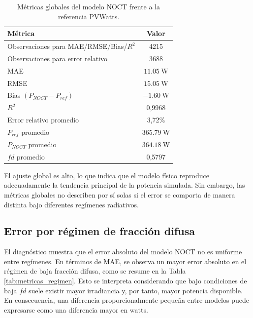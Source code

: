 \documentclass[12pt, letterpaper]{article}
\begin{document}
\begin{table}[H]
\centering
\caption{M\'etricas globales del modelo NOCT frente a la referencia PVWatts.}
\label{tab:metricas_globales}
\begin{tabular}{lc}
\toprule
\textbf{M\'etrica} & \textbf{Valor} \\
\midrule
Observaciones para MAE/RMSE/Bias/\(R^2\) & 4215 \\
Observaciones para error relativo & 3688 \\
MAE & \(\SI{11.05}{\watt}\) \\
RMSE & \(\SI{15.05}{\watt}\) \\
Bias \((P_{NOCT} - P_{ref})\) & \(-\SI{1.60}{\watt}\) \\
\(R^2\) & 0,9968 \\
Error relativo promedio & 3,72\% \\
\(P_{ref}\) promedio & \(\SI{365.79}{\watt}\) \\
\(P_{NOCT}\) promedio & \(\SI{364.18}{\watt}\) \\
\(fd\) promedio & 0,5797 \\
\bottomrule
\end{tabular}
\end{table}

El ajuste global es alto, lo que indica que el modelo f\'isico reproduce adecuadamente la tendencia principal de la potencia simulada. Sin embargo, las m\'etricas globales no describen por s\'i solas si el error se comporta de manera distinta bajo diferentes reg\'imenes radiativos.

\subsection{Error por r\'egimen de fracci\'on difusa}

El diagn\'ostico muestra que el error absoluto del modelo NOCT no es uniforme entre reg\'imenes. En t\'erminos de MAE, se observa un mayor error absoluto en el r\'egimen de baja fracci\'on difusa, como se resume en la Tabla \ref{tab:metricas_regimen}. Esto se interpreta considerando que bajo condiciones de baja \(fd\) suele existir mayor irradiancia y, por tanto, mayor potencia disponible. En consecuencia, una diferencia proporcionalmente peque\~na entre modelos puede expresarse como una diferencia mayor en watts.

\begin{table}[H]
\centering
\caption{M\'etricas por r\'egimen de fracci\'on difusa para el modelo NOCT.}
\label{tab:metricas_regimen}
\end{table}
\end{document}

